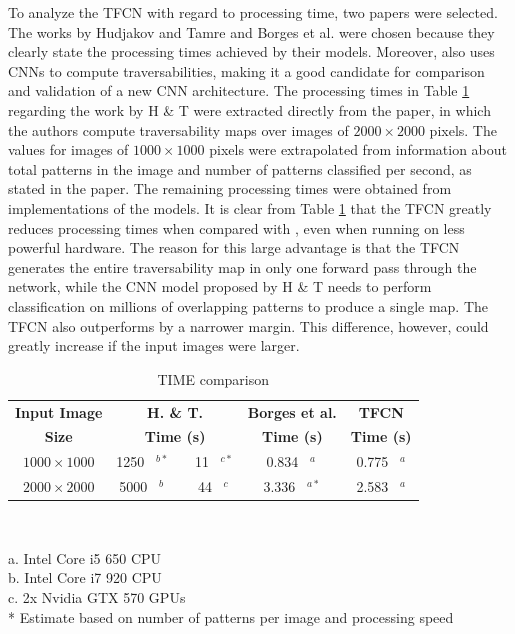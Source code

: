 \documentclass[conference]{IEEEtran}
\begin{document}
To analyze the TFCN with regard to processing time, two papers were selected.
The works by Hudjakov and Tamre \cite{hudjakov:2013} and Borges et al. \cite{borges:2019} were chosen because they clearly state the processing times achieved by their models.
Moreover, \cite{hudjakov:2013} also uses CNNs to compute traversabilities, making it a good candidate for comparison and validation of a new CNN architecture.
The processing times in Table \ref{tab:comparison-time} regarding the work by H \& T were extracted directly from the paper, in which the authors compute traversability maps over images of $2000 \times 2000$ pixels.
The values for images of $1000 \times 1000$ pixels were extrapolated from information about total patterns in the image and number of patterns classified per second, as stated in the paper.
The remaining processing times were obtained from implementations of the models.
It is clear from Table \ref{tab:comparison-time} that the TFCN greatly reduces processing times when compared with \cite{hudjakov:2013}, even when running on less powerful hardware.
The reason for this large advantage is that the TFCN generates the entire traversability map in only one forward pass through the network, while the CNN model proposed by H \& T needs to perform classification on millions of overlapping patterns to produce a single map.
The TFCN also outperforms \cite{borges:2019} by a narrower margin.
This difference, however, could greatly increase if the input images were larger.


\begin{table}[htbp]
\begin{center}
\caption{TIME comparison}
\begin{tabular}{|c|c c c|}
\hline
\textbf{Input Image} & \textbf{H. \& T. \cite{hudjakov:2013}} & \textbf{Borges et al.\cite{borges:2019}} & \textbf{TFCN} \\
\textbf{Size} & \textbf{Time (s)} & \textbf{Time (s)} & \textbf{Time (s)} \\
\hline
$1000 \times 1000$ & 1250 \ $^{b*}$  \ \ \ 11 \ $^{c*}$ & 0.834 \ $^{a\ }$ & \cellcolor{blue!15} 0.775 \ $^{a}$ \\ %
$2000 \times 2000$ & 5000 \ $^{b\phantom{*}}$  \ \ \ 44 \ $^{c\ }$ & 3.336 \ $^{a*}$ & \cellcolor{blue!15} 2.583 \ $^{a}$ \\ \hline
\end{tabular} \\[0.01cm]
\label{tab:comparison-time}
\end{center}
\hspace{0.2cm}
\begin{minipage}[t]{\textwidth}
\scriptsize{a. Intel Core i5 650 CPU} \\
\scriptsize{b. Intel Core i7 920 CPU} \\
\scriptsize{c. 2x Nvidia GTX 570 GPUs} \\
\scriptsize{* Estimate based on number of patterns per image and processing speed}
\end{minipage}
\end{table}
\end{document}
